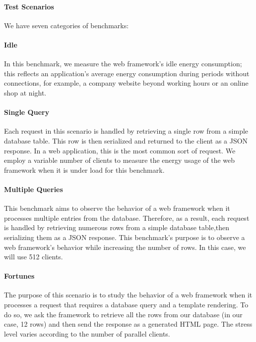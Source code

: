 \paragraph{Test Scenarios}
We have seven categories of benchmarks:
\paragraph{Idle}
In this benchmark, we measure the web framework's idle energy consumption; this reflects an application's average energy consumption during periods without connections, for example, a company website beyond working hours or an online shop at night.

\paragraph{Single Query}
Each request in this scenario is handled by retrieving a single row from a simple database table.
This row is then serialized and returned to the client as a JSON response.
In a web application, this is the most common sort of request.
We employ a variable number of clients to measure the energy usage of the web framework when it is under load for this benchmark.



\paragraph{Multiple Queries}
This benchmark aims to observe the behavior of a web framework when it processes multiple entries from the database.
Therefore, as a result, each request is handled by retrieving numerous rows from a simple database table,then serializing them as a JSON response.
This benchmark's purpose is to observe a web framework's behavior while increasing the number of rows.
In this case, we will use 512 clients.

\paragraph{Fortunes}
The purpose of this scenario is to study the behavior of a web framework when it processes a request that requires a database query and a template rendering.
To do so, we ask the framework to retrieve all the rows from our database (in our case, 12 rows) and then send the response as a generated HTML page.
The stress level varies according to the number of parallel clients.

